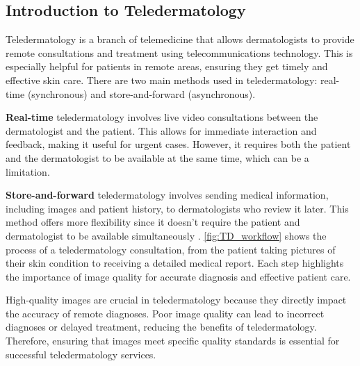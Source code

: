 \subsection{Introduction to Teledermatology}
\label{sub:IntroductionTeledermatology}
Teledermatology is a branch of telemedicine that allows dermatologists to provide remote consultations and treatment using telecommunications technology. This is especially helpful for patients in remote areas, ensuring they get timely and effective skin care. There are two main methods used in teledermatology: real-time (synchronous) and store-and-forward (asynchronous).\par
\vspace{\baselineskip}
\noindent
\textbf{Real-time} teledermatology involves live video consultations between the dermatologist and the patient. This allows for immediate interaction and feedback, making it useful for urgent cases. However, it requires both the patient and the dermatologist to be available at the same time, which can be a limitation. \par
\vspace{\baselineskip}
\noindent
\textbf{Store-and-forward} teledermatology involves sending medical information, including images and patient history, to dermatologists who review it later. This method offers more flexibility since it doesn’t require the patient and dermatologist to be available simultaneously \autocite{SaF}. \autoref{fig:TD_workflow} shows the process of a teledermatology consultation, from the patient taking pictures of their skin condition to receiving a detailed medical report. Each step highlights the importance of image quality for accurate diagnosis and effective patient care.\par
\vspace{\baselineskip}
\noindent
High-quality images are crucial in teledermatology because they directly impact the accuracy of remote diagnoses. Poor image quality can lead to incorrect diagnoses or delayed treatment, reducing the benefits of teledermatology. Therefore, ensuring that images meet specific quality standards is essential for successful teledermatology services.

